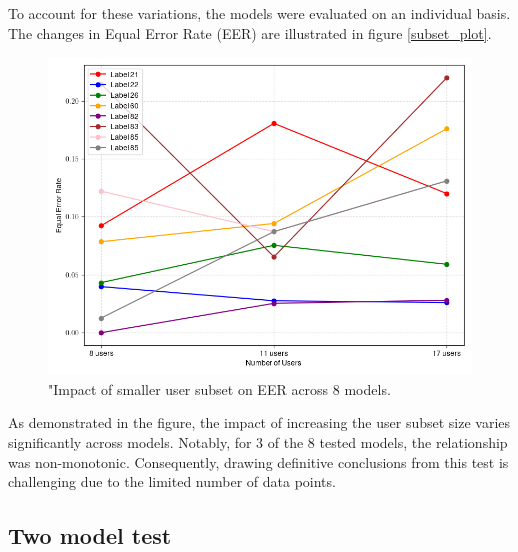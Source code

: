 To account for these variations, the models were evaluated on an individual basis. The changes in Equal Error Rate (EER) are illustrated in figure \ref{subset_plot}.

\begin{figure}[H]
	\centering
	\includegraphics[width=.7\textwidth]{images/subset_test_res.png}
	\caption{"Impact of smaller user subset on EER across 8 models.}
	\label{fig:subset_plot}
\end{figure}

As demonstrated in the figure, the impact of increasing the user subset size varies significantly across models. Notably, for 3 of the 8 tested models, the relationship was non-monotonic. Consequently, drawing definitive conclusions from this test is challenging due to the limited number of data points.

\subsection{Two model test}
